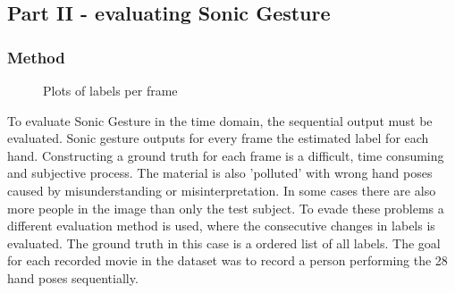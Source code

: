 \subsection{Part II - evaluating Sonic Gesture}

\subsubsection{Method}

\begin{figure}[htbp]
\center{}
\hspace{0.02\linewidth}
\hspace{0.02\linewidth}
\caption{Plots of labels per frame}
\label{fig:performances}
\end{figure}

To evaluate Sonic Gesture in the time domain, the sequential output must be evaluated. Sonic gesture outputs for every frame the estimated label for each hand. Constructing a ground truth for each frame is a difficult, time consuming and subjective process. The material is also 'polluted' with wrong hand poses caused by misunderstanding or misinterpretation. In some cases there are also more people in the image than only the test subject. To evade these problems a different evaluation method is used, where the consecutive changes in labels is evaluated. The ground truth in this case is a ordered list of all labels. The goal for each recorded movie in the dataset was to record a person performing the 28 hand poses sequentially.

